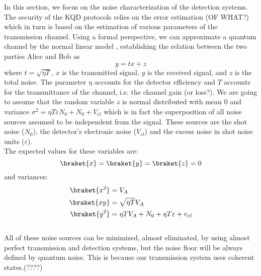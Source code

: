 In this section, we focus on the noise characterization of the detection systems.
The security of the KQD protocols relies on the error estimation (OF WHAT?) which in turn is based on the estimation of various parameters of the transmission channel.
Using a formal perspective, we can approximate a quantum channel by the normal linear model
\cite{wang2018practical},
establishing the relation between the two parties Alice and Bob as
\begin{equation}
	y = tx + z
\end{equation}
where $t=\sqrt{\eta T}$, $x$ is the transmitted signal, $y$ is the received signal, and $z$ is the total noise.
The parameter $\eta$ accounts for the detector efficiency and $T$ accounts for the transmittance of the channel, i.e. the channel gain (or loss?).
We are going to assume that the random variable $z$ is normal distributed with mean $0$ and variance $\sigma^2 = \eta T \varepsilon N_0 + N_0 + V_{el}$ which is in fact the superposition of all noise sources assumed to be independent from the signal.
These sources are the shot noise ($N_0$), the detector's electronic noise ($V_{el}$) and the excess noise in shot noise units ($\varepsilon$).\\
The expected values for these variables are:
\begin{equation}
	\braket{x} = \braket{y} = \braket{z} = 0
\end{equation}
and variances:
\begin{equation}
	\begin{aligned}
		\braket{x^2} &= V_A\\
		\braket{xy}  &= \sqrt{\eta T} V_A\\
		\braket{y^2} &= \eta T V_A + N_0 + \eta T \varepsilon + v_{el}\\
	\end{aligned}
\end{equation}
\\
All of these noise sources can be minimized, almost eliminated, by using almost perfect transmission and detection systems, but the noise floor will be always defined by quantum noise. This is because our transmission system uses coherent states.(????)\\
